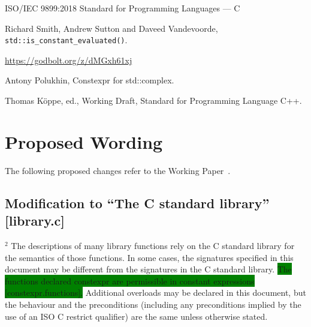 \documentclass[prd,twocolumn,amsmath,amssymb,nofootinbib,eqsecnum]{revtex4-1}
\newcommand{\code}[1]{{\tt #1}}
\newcommand{\highlight}[1]{\colorbox{green}{\!\!\!\! #1}}
\begin{document}
\begin{thebibliography}{1}	
	 ISO/IEC 9899:2018 Standard for Programming Languages --- C
	
	 Richard Smith, Andrew Sutton and Daveed Vandevoorde, \code{std\!::\!is\_constant\_evaluated()}.
	
	 \url{https://godbolt.org/z/dMGxh61xj}	
	
	 Antony Polukhin, Constexpr for std::complex.
	
	 Thomas K\"oppe, ed., Working Draft, Standard for Programming Language C++.	
\end{thebibliography}

\newpage

\onecolumngrid

\section{Proposed Wording}

\setlength{\parindent}{0pt}


The following proposed changes refer to the Working Paper~\cite{WorkingPaper}.

\subsection{Modification to ``The C standard library'' [library.c]}

\hspace{-2.5ex} $^2$ The descriptions of many library functions rely on the C standard library for the semantics of those functions.
In some cases, the signatures specified in this document may be different from the signatures in the C
standard library. 
\highlight{The functions declared constexpr are permissible in constant expressions [constexpr.functions].}
Additional overloads may be declared in this document, but the behaviour and the
preconditions (including any preconditions implied by the use of an ISO C restrict qualifier) are the same
unless otherwise stated.

\vspace{1ex}
\end{document}
